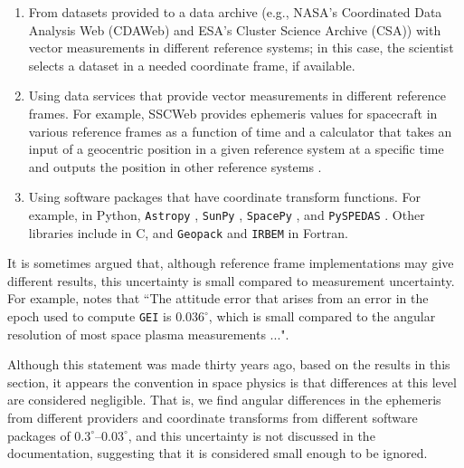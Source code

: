 \documentclass[draft]{agujournal2019}
\begin{document}
\begin{enumerate}

    \parskip 0.1in 

    \item From datasets provided to a data archive (e.g., NASA's Coordinated Data Analysis Web (CDAWeb) and ESA's Cluster Science Archive (CSA)) with vector measurements in different reference systems; in this case, the scientist selects a dataset in a needed coordinate frame, if available.

    \item Using data services that provide vector measurements in different reference frames. For example, SSCWeb provides ephemeris values for spacecraft in various reference frames as a function of time \cite{SSCWeb} and a calculator that takes an input of a geocentric position in a given reference system at a specific time and outputs the position in other reference systems \cite{SSCWebCoordinateCalculator}.

    \item Using software packages that have coordinate transform functions. For example, in Python, \texttt{Astropy} \cite{AstroPy2022}, \texttt{SunPy} \cite{SunPy}, \texttt{SpacePy} \cite{SpacePy}, and \texttt{PySPEDAS} \cite{Angelopoulos2024}. Other libraries include \cite{cxform} in C, and \texttt{Geopack} \cite{Tsyganenko2008} and \texttt{IRBEM} \cite{IRBEM2022} in Fortran.

\end{enumerate}


It is sometimes argued that, although reference frame implementations may give different results, this uncertainty is small compared to measurement uncertainty. For example,  notes that ``The attitude error that arises from an error in the epoch used to compute \texttt{GEI} is $0.036^\circ$, which is small compared to the angular resolution of most space plasma measurements ...". 

Although this statement was made thirty years ago, based on the results in this section, it appears the convention in space physics is that differences at this level are considered negligible. That is, we find angular differences in the ephemeris from different providers and coordinate transforms from different software packages of $0.3^\circ$--$0.03^\circ$, and this uncertainty is not discussed in the documentation, suggesting that it is considered small enough to be ignored.
\end{document}
